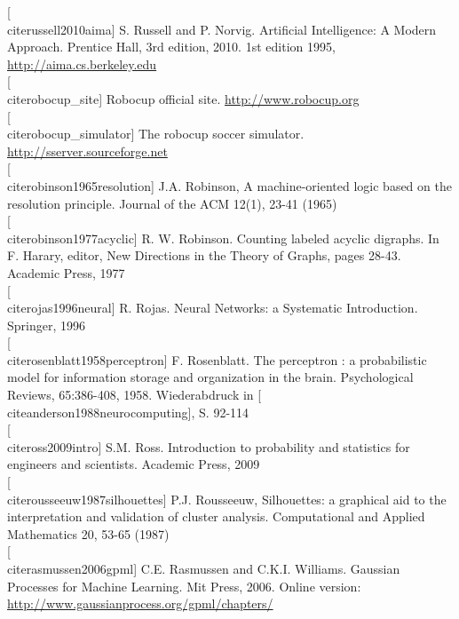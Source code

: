 \documentclass[10pt]{book}
\begin{document}
[\\cite{russell2010aima}] S. Russell and P. Norvig. Artificial Intelligence: A Modern Approach. Prentice Hall, 3rd edition, 2010. 1st edition 1995, \href{http://aima.cs.berkeley.edu}{http://aima.cs.berkeley.edu}\\[0pt]
[\\cite{robocup_site}] Robocup official site. \href{http://www.robocup.org}{http://www.robocup.org}\\[0pt]
[\\cite{robocup_simulator}] The robocup soccer simulator. \href{http://sserver.sourceforge.net}{http://sserver.sourceforge.net}\\[0pt]
[\\cite{robinson1965resolution}] J.A. Robinson, A machine-oriented logic based on the resolution principle. Journal of the ACM 12(1), 23-41 (1965)\\[0pt]
[\\cite{robinson1977acyclic}] R. W. Robinson. Counting labeled acyclic digraphs. In F. Harary, editor, New Directions in the Theory of Graphs, pages 28-43. Academic Press, 1977\\[0pt]
[\\cite{rojas1996neural}] R. Rojas. Neural Networks: a Systematic Introduction. Springer, 1996\\[0pt]
[\\cite{rosenblatt1958perceptron}] F. Rosenblatt. The perceptron : a probabilistic model for information storage and organization in the brain. Psychological Reviews, 65:386-408, 1958. Wiederabdruck in [\\cite{anderson1988neurocomputing}], S. 92-114\\[0pt]
[\\cite{ross2009intro}] S.M. Ross. Introduction to probability and statistics for engineers and scientists. Academic Press, 2009\\[0pt]
[\\cite{rousseeuw1987silhouettes}] P.J. Rousseeuw, Silhouettes: a graphical aid to the interpretation and validation of cluster analysis. Computational and Applied Mathematics 20, 53-65 (1987)\\[0pt]
[\\cite{rasmussen2006gpml}] C.E. Rasmussen and C.K.I. Williams. Gaussian Processes for Machine Learning. Mit Press, 2006. Online version: \href{http://www.gaussianprocess.org/gpml/chapters/}{http://www.gaussianprocess.org/gpml/chapters/}\\
\end{document}
